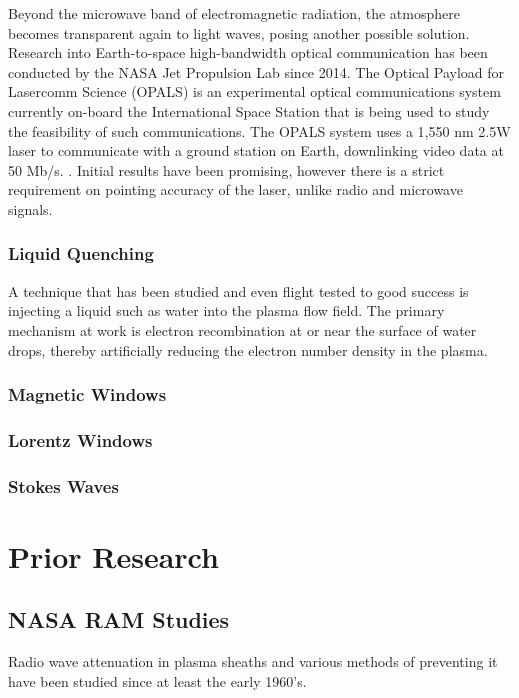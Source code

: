 \documentclass[twocolumn]{article}
\begin{document}
	Beyond the microwave band of electromagnetic radiation, the atmosphere becomes transparent again to light waves, posing another possible solution.
	Research into Earth-to-space high-bandwidth optical communication has been conducted by the NASA Jet Propulsion Lab since 2014.
	The Optical Payload for Lasercomm Science (OPALS) is an experimental optical communications system currently on-board the International Space Station that is being used to study the feasibility of such communications.
	The OPALS system uses a 1,550 nm 2.5W laser to communicate with a ground station on Earth, downlinking video data at 50 Mb/s. \cite{oaida_optical_2014}.
	Initial results have been promising, however there is a strict requirement on pointing accuracy of the laser, unlike radio and microwave signals. \cite{abrahamson_achieving_2015}
	
	\subsubsection*{Liquid Quenching}
	A technique that has been studied and even flight tested to good success is injecting a liquid such as water into the plasma flow field.
	The primary mechanism at work is electron recombination at or near the surface of water drops, thereby artificially reducing the electron number density in the plasma. %
	
	\subsubsection*{Magnetic Windows}
		
	\subsubsection*{Lorentz Windows}
	
	\subsubsection*{Stokes Waves}
	

	
	
\section{Prior Research} \label{sec:Prior}
	\subsection*{NASA RAM Studies}
	Radio wave attenuation in plasma sheaths and various methods of preventing it have been studied since at least the early 1960's.
	
\end{document}

